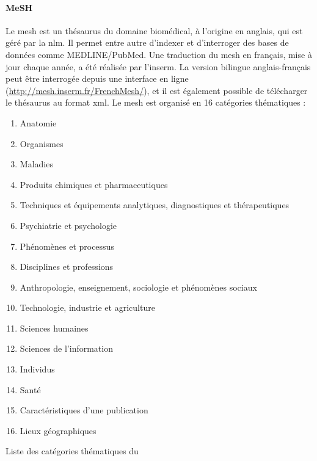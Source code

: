 \paragraph{MeSH}
Le \gls{mesh} \cite{lipscombMedicalSubjectHeadings2000} est un thésaurus du domaine biomédical, à l'origine en anglais, qui est géré par la \gls{nlm}.
Il permet entre autre d'indexer et d'interroger des bases de données comme MEDLINE/PubMed.
Une traduction du \gls{mesh} en français, mise à jour chaque année, a été réalisée par l'\gls{inserm}.
La version bilingue anglais-français peut être interrogée depuis une interface en ligne (\url{http://mesh.inserm.fr/FrenchMesh/}), et il est également possible de télécharger le thésaurus au format \acrshort{xml}.
Le \gls{mesh} est organisé en \num{16} catégories thématiques :

\begin{table}[H]
    \begin{multicols}{2}
        \begin{enumerate}[label=\textbf{\Alph*}]
            \item \label{mesh:A} Anatomie
            \item \label{mesh:B} Organismes
            \item \label{mesh:C} Maladies
            \item \label{mesh:D} Produits chimiques et pharmaceutiques
            \item \label{mesh:E} Techniques et équipements analytiques, diagnostiques et thérapeutiques
            \item \label{mesh:F} Psychiatrie et psychologie
            \item \label{mesh:G} Phénomènes et processus
            \item \label{mesh:H} Disciplines et professions
            \item \label{mesh:I} Anthropologie, enseignement, sociologie et phénomènes sociaux
            \item \label{mesh:J} Technologie, industrie et agriculture
            \item \label{mesh:K} Sciences humaines
            \item \label{mesh:L} Sciences de l'information
            \item \label{mesh:M} Individus
            \item \label{mesh:N} Santé
                  \setcounter{enumi}{21}
            \item \label{mesh:V} Caractéristiques d'une publication
                  \setcounter{enumi}{25}
            \item \label{mesh:Z} Lieux géographiques
        \end{enumerate}
    \end{multicols}
    \caption{Liste des catégories thématiques du }
\end{table}


